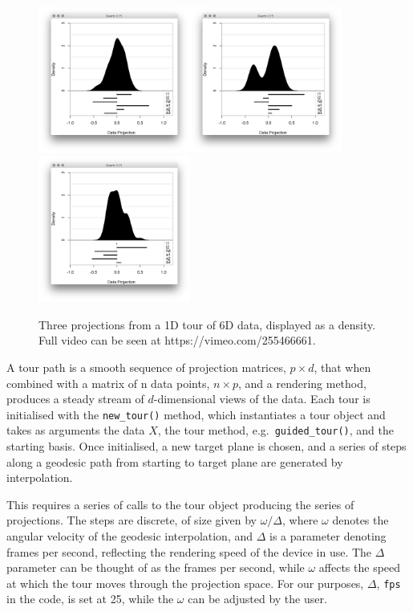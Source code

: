 \begin{figure}[ht]
\centerline{\includegraphics[width=5cm]{figures/tour1.png}\includegraphics[width=5cm]{figures/tour2.png}\includegraphics[width=5cm]{figures/tour3.png}}
\caption{Three projections from a 1D tour of 6D data, displayed as a density. Full video can be seen at https://vimeo.com/255466661.}
\label{tour}
\end{figure}

A tour path is a smooth sequence of projection matrices, \(p\times d\),
that when combined with a matrix of n data points, \(n\times p\), and a
rendering method, produces a steady stream of \(d\)-dimensional views of
the data. Each tour is initialised with the \texttt{new\_tour()} method,
which instantiates a tour object and takes as arguments the data \(X\),
the tour method, e.g.~\texttt{guided\_tour()}, and the starting basis.
Once initialised, a new target plane is chosen, and a series of steps
along a geodesic path from starting to target plane are generated by
interpolation.

This requires a series of calls to the tour object producing the series
of projections. The steps are discrete, of size given by
\(\omega/\Delta\), where \(\omega\) denotes the angular velocity of the
geodesic interpolation, and \(\Delta\) is a parameter denoting frames
per second, reflecting the rendering speed of the device in use. The
\(\Delta\) parameter can be thought of as the frames per second, while
\(\omega\) affects the speed at which the tour moves through the
projection space. For our purposes, \(\Delta\), \texttt{fps} in the
code, is set at 25, while the \(\omega\) can be adjusted by the user.

